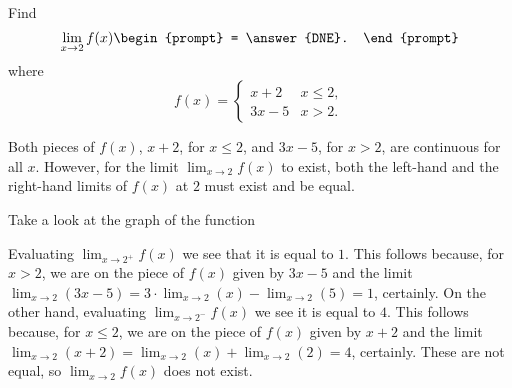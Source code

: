 \documentclass{ximera}
\author{Gregory Hartman \and Matthew Carr}
\begin{document}
\begin{exercise}



  Find 
  \[
  \lim_{x\to 2} f(x)
  \begin{prompt}
  = \answer{DNE}.
  \end{prompt}
  \]
  where
  \[
  f(x) = \left\{\begin{array}{cl} x+2 & x\leq 2, \\ 3x-5 & x>2. \end{array}\right.
  \]
    \begin{hint}
     Both pieces of $f(x)$, $x+2$, for $x\le2$, and $3x-5$, for $x>2$, are continuous for all $x$. However, for the limit $\lim_{x\to2}f(x)$ to exist, both the left-hand and the right-hand limits of $f(x)$ at $2$ must exist and be equal.
    \end{hint}
     \begin{hint}
    	Take a look at the graph of the function
    \begin{center}
      \end{center} 
    \end{hint}
    \begin{hint}
     Evaluating $\lim_{x\to2^{+}}f(x)$ we see that it is equal to $1$. This follows because, for $x>2$, we are on the piece of $f(x)$ given by $3x-5$ and the limit $\lim_{x\to2}\left({3x-5}\right)=3\cdot\lim_{x\to 2}(x)-\lim_{x\to2}\left({5}\right)=1$, certainly. On the other hand, evaluating $\lim_{x\to2^{-}}f(x)$ we see it is equal to $4$. This follows because, for $x\le2$, we are on the piece of $f(x)$ given by $x+2$ and the limit $\lim_{x\to2}\left({x+2}\right)=\lim_{x\to2}(x)+\lim_{x\to2}\left({2}\right)=4$, certainly. These are not equal, so $\lim_{x\to 2}f(x)$ does not exist.
    \end{hint} 
\end{exercise}
\end{document}
